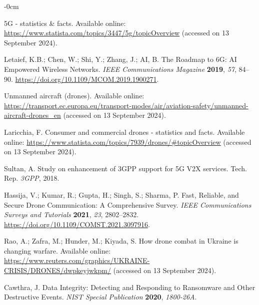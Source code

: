 \documentclass[futureinternet,article,submit,pdftex,moreauthors]{Definitions/mdpi}
\begin{document}
\begin{adjustwidth}{-\extralength}{0cm}


\begin{thebibliography}{999}

5G - statistics \& facts. Available online: \url{https://www.statista.com/topics/3447/5g/topicOverview} (accessed on 13 September 2024).

Letaief, K.B.; Chen, W.; Shi, Y.; Zhang, J.; AI, B. The Roadmap to 6G: AI Empowered Wireless Networks. {\em IEEE Communications Magazine} {\bf 2019}, {\em 57}, 84--90. \url{https://doi.org/10.1109/MCOM.2019.1900271}.

Unmanned aircraft (drones). Available online: \url{https://transport.ec.europa.eu/transport-modes/air/aviation-safety/unmanned-aircraft-drones_en} (accessed on 13 September 2024).

Laricchia, F. Consumer and commercial drones - statistics and facts. Available online: \url{https://www.statista.com/topics/7939/drones/\#topicOverview} (accessed on 13 September 2024).

Sultan, A. Study on enhancement of 3GPP support for 5G V2X services. Tech. Rep. {\em 3GPP}, 2018.

Hassija, V.; Kumar, R.; Gupta, H.; Singh, S.; Sharma, P. Fast, Reliable, and Secure Drone Communication: A Comprehensive Survey. {\em IEEE Communications Surveys and Tutorials} {\bf 2021}, {\em 23}, 2802--2832. \url{https://doi.org/10.1109/COMST.2021.3097916}.

Rao, A.; Zafra, M.; Hunder, M.; Kiyada, S. How drone combat in Ukraine is changing warfare. Available online: \url{https://www.reuters.com/graphics/UKRAINE-CRISIS/DRONES/dwpkeyjwkpm/} (accessed on 13 September 2024).

Cawthra, J. Data Integrity: Detecting and Responding to Ransomware and Other Destructive Events. {\em NIST Special Publication} {\bf 2020}, {\em 1800-26A}.


\end{thebibliography}
\end{adjustwidth}
\end{document}
